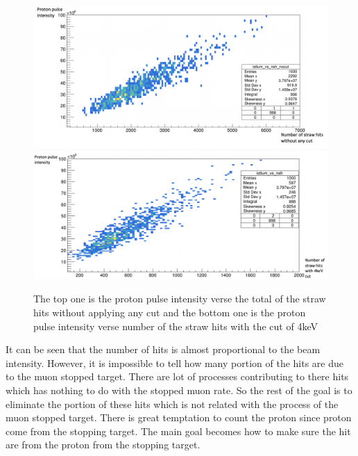 \documentclass[12pt]{extarticle}
\begin{document}
\begin{figure}[H]
\centering
\includegraphics[width=1.1\linewidth]{figure/Lum_vs_hits_png.png}
\includegraphics[width=1.1\linewidth]{figure/Lum_vs_protonhits.png}
\caption{The top one is the proton pulse intensity verse the total of the straw hits without applying any cut and the bottom one is the proton pulse intensity verse number of the straw hits with the cut of 4keV }
\label{Lum_vs_totalhits}
\end{figure}
\noindent It can be seen that the number of hits is almost proportional to the beam intensity. However, it is impossible to tell how many portion of the hits are due to the muon stopped target. There are lot of processes contributing to there hits which has nothing to do with the stopped muon rate. So the rest of the goal is to eliminate the portion of these hits which is not related with the process of the muon stopped target. 
There is great temptation to count the proton since proton come from the stopping target. The main goal becomes how to make sure the hit are from the proton from the stopping target.
\end{document}
